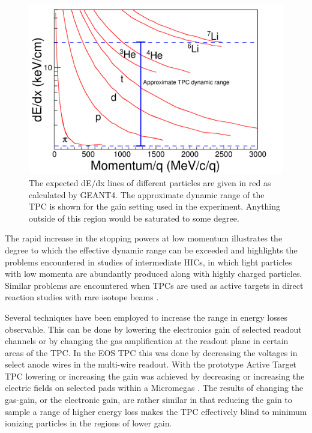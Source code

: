 \documentclass[review]{elsarticle}
\begin{document}
  
\begin{figure}[ht!]
\includegraphics[width=\linewidth]{intrographic}
\caption{The expected dE/dx lines of different particles are given in red as calculated by GEANT4. The approximate dynamic range of the TPC is shown for the gain setting used in the experiment. Anything outside of this region would be saturated to some degree.}
\label{fig:intro}
\end{figure}

The rapid increase in the stopping powers at low momentum illustrates the degree to which the effective dynamic range can be exceeded and highlights the problems encountered in studies of intermediate HICs, in which light particles with low momenta are abundantly produced along with highly charged particles. Similar problems are encountered when TPCs are used as active targets in direct reaction studies with rare isotope beams \cite{pattpc}. 

Several techniques have been employed to increase the range in energy losses observable. This can be done by lowering the electronics gain of selected readout channels or by changing the gas amplification at the readout plane in certain areas of the TPC. In the EOS TPC \cite{eos} this was done by decreasing the voltages in select anode wires in the multi-wire readout. With the prototype Active Target TPC lowering or increasing the gain was achieved by decreasing or increasing the electric fields on selected pads within a Micromegas \cite{pattpc}. The results of changing the gas-gain, or the electronic gain, are rather similar in that reducing the gain to sample a range of higher energy loss makes the TPC effectively blind to minimum ionizing particles in  the regions of lower gain.
\end{document}
